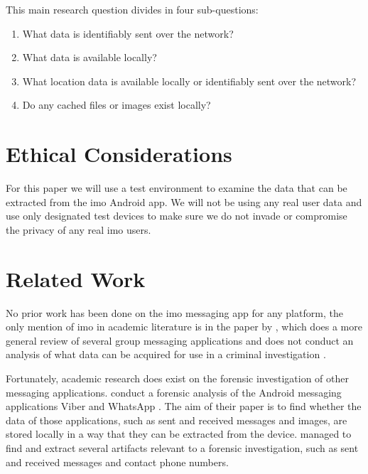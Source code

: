 \documentclass[conference]{IEEEtran}
\begin{document}
\vspace{0.1cm}

\noindent{} This main research question divides in four sub-questions:

\begin{enumerate}
    \item What data is identifiably sent over the network?
    \item What data is available locally?
    \item What location data is available locally or identifiably sent over the
        network?
    \item Do any cached files or images exist locally?
\end{enumerate}


\section{Ethical Considerations}\label{sec:ethics}

For this paper we will use a test environment to examine the data that can be
extracted from the imo Android app. We will not be using any real user data and
use only designated test devices to make sure we do not invade or compromise the
privacy of any real imo users.


\section{Related Work}\label{sec:relwork}

No prior work has been done on the imo messaging app for any platform, the only
mention of imo in academic literature is in the paper by \citeauthor{zhu},
which does a more general review of several group messaging applications and
does not conduct an analysis of what data can be acquired for use in a criminal
investigation \cite{zhu}.

Fortunately, academic research does exist on the forensic investigation of
other messaging applications. \citeauthor{mahajan2013forensic} conduct a
forensic analysis of the Android messaging applications Viber and WhatsApp
\cite{mahajan2013forensic}. The aim of their paper is to find whether the data
of those applications, such as sent and received messages and images, are
stored locally in a way that they can be extracted from the device.
\citeauthor{mahajan2013forensic} managed to find and extract several artifacts
relevant to a forensic investigation, such as sent and received messages and
contact phone numbers.
\end{document}
